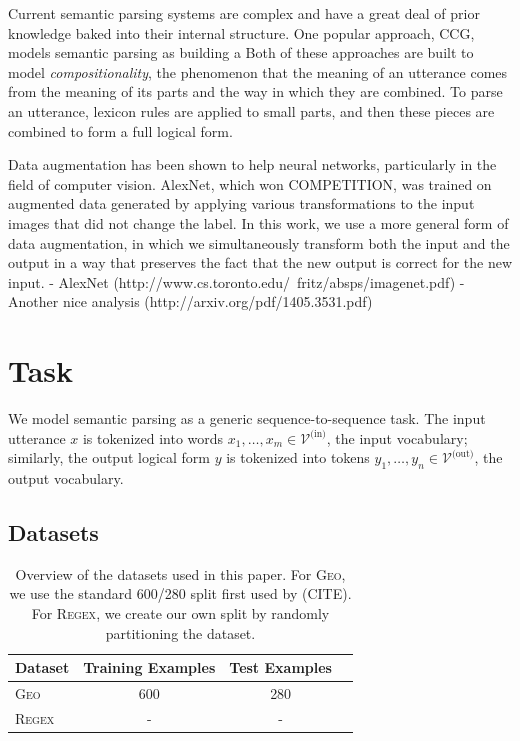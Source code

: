 \documentclass[11pt,letterpaper]{article}
\newcommand{\regex}{\textsc{Regex}\xspace}
\newcommand{\geo}{\textsc{Geo}\xspace}
\newcommand{\vocabin}{\mathcal{V}^{\text{(in)}}}
\newcommand{\vocabout}{\mathcal{V}^{\text{(out)}}}
\begin{document}
Current semantic parsing systems are
complex and have a great deal of prior knowledge
baked into their internal structure.
One popular approach, CCG, models semantic parsing as 
building a 
Both of these approaches are built to model \emph{compositionality},
the phenomenon that the meaning of an utterance comes from
the meaning of its parts and the way in which they are combined.
To parse an utterance, lexicon rules are applied to
small parts, and then these pieces are combined to form a full
logical form.

Data augmentation has been shown to help neural networks,
particularly in the field of computer vision.
AlexNet, which won COMPETITION, was trained on 
augmented data generated by applying various transformations
to the input images that did not change the label.
In this work, we use a more general form of data augmentation,
in which we simultaneously transform both the input and the output
in a way that preserves the fact that the new output is correct
for the new input.
- AlexNet (http://www.cs.toronto.edu/~fritz/absps/imagenet.pdf) 
- Another nice analysis (http://arxiv.org/pdf/1405.3531.pdf) 

\section{Task}
We model semantic parsing as a generic sequence-to-sequence task.
The input utterance $x$ is tokenized into words $x_1, \dotsc, x_m
\in \vocabin$, the input vocabulary;
similarly, the output logical form $y$ is tokenized
into tokens $y_1, \dotsc, y_n \in \vocabout$, the output vocabulary.

\subsection{Datasets}
\begin{table}[ht]
  \centering
  \small
  \begin{tabular}{|l|c|c|c|}
    \hline
    Dataset & Training Examples & Test Examples \\
    \hline
    \geo & 600 & 280 \\
    \regex & - & - \\
    \hline
  \end{tabular}
  \caption{Overview of the datasets used in this paper.  
  For \geo, we use the standard 600/280 split first used by (CITE).
  For \regex, we create our own split by randomly partitioning
the dataset.}
  \label{tab:datasets}
\end{table}
\end{document}
